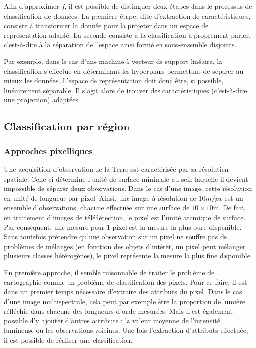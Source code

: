 Afin d'approximer $f$, il est possible de distinguer deux étapes dans le processus de classification de données. La première étape, dite d'extraction de caractéristiques, consiste à transformer la donnée pour la projeter dans un espace de représentation adapté. La seconde consiste à la classification à proprement parler, c'est-à-dire à la séparation de l'espace ainsi formé en sous-ensemble disjoints.

Par exemple, dans le cas d'une machine à vecteur de support linéaire, la classification s'effectue en déterminant les hyperplans permettant de séparer au mieux les données. L'espace de représentation doit donc être, si possible, linéairement séparable. Il s'agit alors de trouver des caractéristiques (c'est-à-dire une projection) adaptées

\subsection{Classification par région}

\subsubsection{Approches pixelliques}

Une acquisition d'observation de la Terre est caractérisée par sa résolution spatiale. Celle-ci détermine l'unité de surface minimale au sein laquelle il devient impossible de séparer deux observations. Dans le cas d'une image, cette résolution en unité de longueur par pixel. Ainsi, une image à résolution de $10m/px$ est un ensemble d'observations, chacune effectuée sur une surface de $10\times10$m. De fait, en traitement d'images de télédétection, le pixel est l'unité atomique de surface. Par conséquent, une mesure pour 1 pixel est la mesure la plus pure disponible. Sans toutefois prétendre qu'une observation sur un pixel ne souffre pas de problèmes de mélanges (en fonction des objets d'intérêt, un pixel peut mélanger plusieurs classes hétérogènes), le pixel représente la mesure la plus fine disponible.

En première approche, il semble raisonnable de traiter le problème de cartographie comme un problème de classification des pixels. Pour ce faire, il est dans un premier temps nécessaire d'extraire des attributs du pixel. Dans le cas d'une image multispectrale, cela peut par exemple être la proportion de lumière réfléchie dans chacune des longueurs d'onde mesurées. Mais il est également possible d'y ajouter d'autres attributs : la valeur moyenne de l'intensité lumineuse ou les observations voisines. Une fois l'extraction d'attributs effectuée, il est possible de réaliser une classification.

